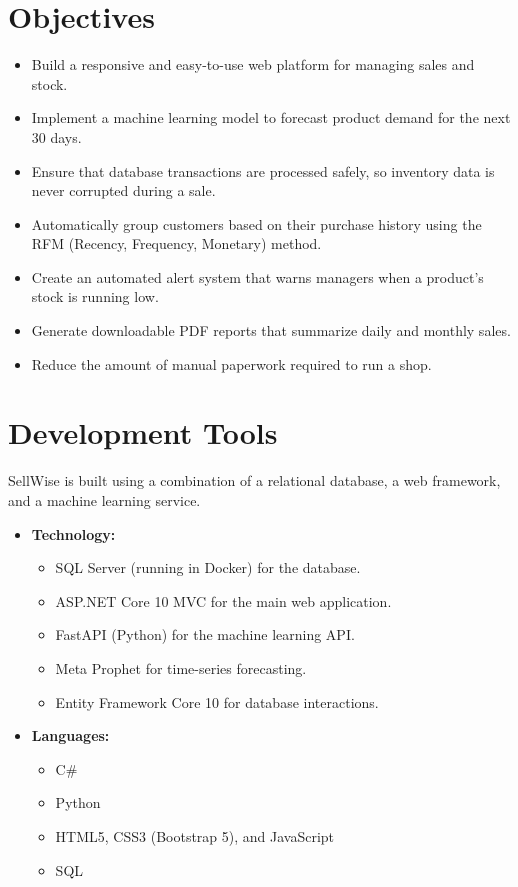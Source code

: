 \documentclass[12pt,a4paper]{report}
\begin{document}
\section{Objectives}
\begin{itemize}
    \item Build a responsive and easy-to-use web platform for managing sales and stock.
    \item Implement a machine learning model to forecast product demand for the next 30 days.
    \item Ensure that database transactions are processed safely, so inventory data is never corrupted during a sale.
    \item Automatically group customers based on their purchase history using the RFM (Recency, Frequency, Monetary) method.
    \item Create an automated alert system that warns managers when a product's stock is running low.
    \item Generate downloadable PDF reports that summarize daily and monthly sales.
    \item Reduce the amount of manual paperwork required to run a shop.
\end{itemize}

\section{Development Tools}
SellWise is built using a combination of a relational database, a web framework, and a machine learning service.
\begin{itemize}
    \item \textbf{Technology:}
    \begin{itemize}
        \item SQL Server (running in Docker) for the database.
        \item ASP.NET Core 10 MVC for the main web application.
        \item FastAPI (Python) for the machine learning API.
        \item Meta Prophet for time-series forecasting.
        \item Entity Framework Core 10 for database interactions.
    \end{itemize}
    \item \textbf{Languages:}
    \begin{itemize}
        \item C\#
        \item Python
        \item HTML5, CSS3 (Bootstrap 5), and JavaScript
        \item SQL
    \end{itemize}
\end{itemize}
\end{document}
